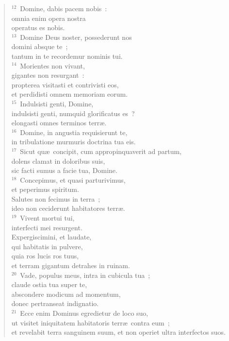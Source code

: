 \begin{flushleft}
\begin{verse}
${}^{12}$~Domine, dabis pacem nobis~:\\ omnia enim opera nostra\\ operatus es nobis.\\
${}^{13}$~Domine Deus noster, possederunt nos\\ domini absque te~;\\ tantum in te recordemur nominis tui.\\
${}^{14}$~Morientes non vivant,\\ gigantes non resurgant~:\\ propterea visitasti et contrivisti eos,\\ et perdidisti omnem memoriam eorum.\\
${}^{15}$~Indulsisti genti, Domine,\\ indulsisti genti, numquid glorificatus es~?\\ elongasti omnes terminos terr\ae .\\
${}^{16}$~Domine, in angustia requisierunt te,\\ in tribulatione murmuris doctrina tua eis.\\
${}^{17}$~Sicut qu\ae\ concipit, cum appropinquaverit ad partum,\\ dolens clamat in doloribus suis,\\ sic facti sumus a facie tua, Domine.\\
${}^{18}$~Concepimus, et quasi parturivimus,\\ et peperimus spiritum.\\ Salutes non fecimus in terra~;\\ ideo non ceciderunt habitatores terr\ae .\\
${}^{19}$~Vivent mortui tui,\\ interfecti mei resurgent.\\ Expergiscimini, et laudate,\\ qui habitatis in pulvere,\\ quia ros lucis ros tuus,\\ et terram gigantum detrahes in ruinam.\\
${}^{20}$~Vade, populus meus, intra in cubicula tua~;\\ claude ostia tua super te,\\ abscondere modicum ad momentum,\\ donec pertranseat indignatio.\\
${}^{21}$~Ecce enim Dominus egredietur de loco suo,\\ ut visitet iniquitatem habitatoris terr\ae\ contra eum~;\\ et revelabit terra sanguinem suum, et non operiet ultra interfectos suos.\end{verse}\end{flushleft}


